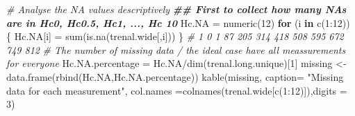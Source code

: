 \documentclass[
]{article}
\newenvironment{Shaded}{\begin{snugshade}}{\end{snugshade}}
\newcommand{\AttributeTok}[1]{\textcolor[rgb]{0.77,0.63,0.00}{#1}}
\newcommand{\CommentTok}[1]{\textcolor[rgb]{0.56,0.35,0.01}{\textit{#1}}}
\newcommand{\ControlFlowTok}[1]{\textcolor[rgb]{0.13,0.29,0.53}{\textbf{#1}}}
\newcommand{\DecValTok}[1]{\textcolor[rgb]{0.00,0.00,0.81}{#1}}
\newcommand{\DocumentationTok}[1]{\textcolor[rgb]{0.56,0.35,0.01}{\textbf{\textit{#1}}}}
\newcommand{\FunctionTok}[1]{\textcolor[rgb]{0.00,0.00,0.00}{#1}}
\newcommand{\NormalTok}[1]{#1}
\newcommand{\OtherTok}[1]{\textcolor[rgb]{0.56,0.35,0.01}{#1}}
\newcommand{\SpecialCharTok}[1]{\textcolor[rgb]{0.00,0.00,0.00}{#1}}
\newcommand{\StringTok}[1]{\textcolor[rgb]{0.31,0.60,0.02}{#1}}
\begin{document}
\begin{Shaded}
\begin{Highlighting}[]
\CommentTok{\# Analyse the NA values descriptively}
\DocumentationTok{\#\# First to collect how many NAs are in Hc0, Hc0.5, Hc1, ..., Hc 10}
\NormalTok{Hc.NA }\OtherTok{=} \FunctionTok{numeric}\NormalTok{(}\DecValTok{12}\NormalTok{)}
\ControlFlowTok{for}\NormalTok{ (i }\ControlFlowTok{in} \FunctionTok{c}\NormalTok{(}\DecValTok{1}\SpecialCharTok{:}\DecValTok{12}\NormalTok{)) \{}
\NormalTok{  Hc.NA[i] }\OtherTok{=} \FunctionTok{sum}\NormalTok{(}\FunctionTok{is.na}\NormalTok{(trenal.wide[,i]))}
\NormalTok{\}}
\CommentTok{\# 1   0   1  87 205 314 418 508 595 672 749 812}
\CommentTok{\# The number of missing data / the ideal case have all meassurements for everyone}
\NormalTok{Hc.NA.percentage }\OtherTok{=}\NormalTok{ Hc.NA}\SpecialCharTok{/}\FunctionTok{dim}\NormalTok{(trenal.long.unique)[}\DecValTok{1}\NormalTok{]}
\NormalTok{missing }\OtherTok{\textless{}{-}} \FunctionTok{data.frame}\NormalTok{(}\FunctionTok{rbind}\NormalTok{(Hc.NA,Hc.NA.percentage))}
\FunctionTok{kable}\NormalTok{(missing, }\AttributeTok{caption=} \StringTok{"Missing data for each measurement"}\NormalTok{,}
      \AttributeTok{col.names =}\FunctionTok{colnames}\NormalTok{(trenal.wide[}\FunctionTok{c}\NormalTok{(}\DecValTok{1}\SpecialCharTok{:}\DecValTok{12}\NormalTok{)]),}\AttributeTok{digits =} \DecValTok{3}\NormalTok{)}
\end{Highlighting}
\end{Shaded}
\end{document}
